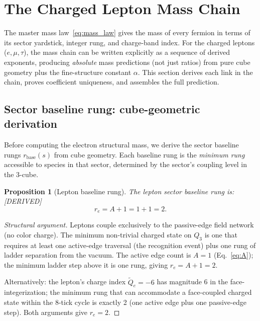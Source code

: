 \documentclass[11pt,a4paper]{article}
\newtheorem{proposition}[theorem]{Proposition}
\theoremstyle{definition}
\theoremstyle{remark}
\newcommand{\tildeQ}{\tilde{Q}}
\newcommand{\DERIVED}{\textcolor{blue!70!black}{\footnotesize\textsf{[DERIVED]}}}
\begin{document}

\section{The Charged Lepton Mass Chain}
\label{sec:lepton_chain}

The master mass law~\eqref{eq:mass_law} gives the mass of every fermion in
terms of its sector yardstick, integer rung, and charge-band index.  For
the charged leptons ($e, \mu, \tau$), the mass chain can be written
explicitly as a sequence of derived exponents, producing \emph{absolute}
mass predictions (not just ratios) from pure cube geometry plus the
fine-structure constant $\alpha$.  This section derives each link in the
chain, proves coefficient uniqueness, and assembles the full prediction.

\subsection{Sector baseline rung: cube-geometric derivation}
\label{sec:baseline_rungs}

Before computing the electron structural mass, we derive the sector
baseline rungs $r_{\mathrm{base}}(s)$ from cube geometry.  Each baseline
rung is the \emph{minimum rung} accessible to species in that sector,
determined by the sector's coupling level in the 3-cube.

\begin{proposition}[Lepton baseline rung]
\label{prop:r_e}
The lepton sector baseline rung is: \DERIVED{}
\begin{equation}
  \boxed{r_e = A + 1 = 1 + 1 = 2.}
  \label{eq:r_e}
\end{equation}
\end{proposition}

\begin{proof}[Structural argument]
Leptons couple exclusively to the passive-edge field network (no color
charge).  The minimum non-trivial charged state on $Q_3$ is one that
requires at least one active-edge traversal (the recognition event) plus
one rung of ladder separation from the vacuum.  The active edge count is
$A = 1$ (Eq.~\eqref{eq:A}); the minimum ladder step above it is one rung,
giving $r_e = A + 1 = 2$.

Alternatively: the lepton's charge index $\tildeQ_e = -6$ has magnitude 6
in the face-integerization; the minimum rung that can accommodate a
face-coupled charged state within the 8-tick cycle is exactly 2 (one active
edge plus one passive-edge step).  Both arguments give $r_e = 2$.
\end{proof}
\end{document}
